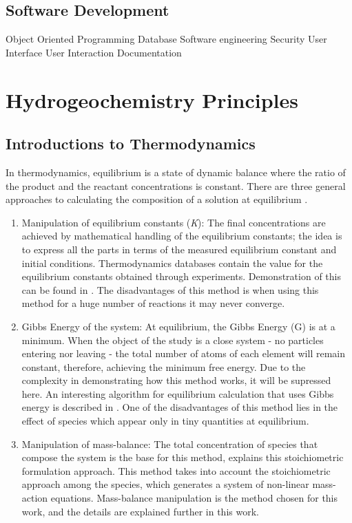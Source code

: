 \documentclass[ppgc,mestrado,english]{iiufrgs}
\begin{document}
\subsection{Software Development}
Object Oriented Programming
Database
Software engineering
Security
User Interface
User Interaction
Documentation


\section{Hydrogeochemistry Principles}

\subsection{Introductions to Thermodynamics}
In thermodynamics, equilibrium is a state of dynamic balance where the ratio of the product and the reactant concentrations is constant. There are three general approaches to calculating the composition of a solution at equilibrium \cite{Petrucci:07}.
\begin{enumerate}
\item Manipulation of equilibrium constants (\emph{K}): The final concentrations are achieved by mathematical handling of the equilibrium constants; the idea is to express all the parts in terms of the measured equilibrium constant and initial conditions. Thermodynamics databases contain the value for the equilibrium constants obtained through experiments. Demonstration of this can be found in \cite{Kehew:00}. The disadvantages of this method is when using this method for a huge number of reactions it may never converge.
\item Gibbs Energy of the system: At equilibrium, the Gibbs Energy (G) is at a minimum. When the object of the study is a close system - no particles entering nor leaving - the total number of atoms of each element will remain constant, therefore, achieving the minimum free energy. Due to the complexity in demonstrating how this method works, it will be supressed here. An interesting algorithm for equilibrium calculation that uses Gibbs energy is described in \cite{Allan:15}. One of the disadvantages of this method lies in the effect of species which appear only in tiny quantities at equilibrium.
\item Manipulation of mass-balance: The total concentration of species that compose the system is the base for this method, \cite{Smith:80} explains this stoichiometric formulation approach. This method takes into account the stoichiometric approach among the species, which generates a system of non-linear mass-action equations. Mass-balance manipulation is the method chosen for this work, and the details are explained further in this work.
\end{enumerate}
\end{document}
